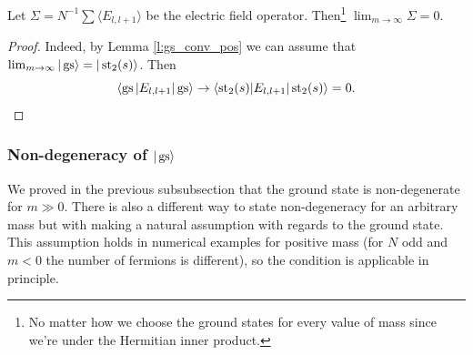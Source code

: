 \begin{proposition}
Let $\Sigma = N^{-1}\sum \langle E_{l,l+1} \rangle$ be the electric field operator. Then\footnote{No matter how we choose the ground states for every value of mass since we're under the Hermitian inner product.} $\lim_{m \rightarrow \infty} \Sigma = 0$.
\end{proposition}
\begin{proof}
Indeed, by Lemma \ref{l:gs_conv_pos} we can assume that $\lim_{m \rightarrow \infty} |\operatorname{gs}\rangle = |\operatorname{st}_2(s)\rangle$. Then 
\[
\langle \operatorname{gs} | E_{l,l+1} | \operatorname{gs} \rangle \rightarrow \langle \operatorname{st}_2(s) | E_{l,l+1}|\operatorname{st}_2(s)\rangle = 0.\qedhere
\]
\end{proof}

\subsubsection{Non-degeneracy of $|\operatorname{gs}\rangle$}

We proved in the previous subsubsection that the ground state is non-degenerate for $m \gg 0$. There is also a different way to state non-degeneracy for an arbitrary mass but with making a natural assumption with regards to the ground state. This assumption holds in numerical examples for positive mass (for $N$ odd and $m < 0$ the number of fermions is different), so the condition is applicable in principle.

